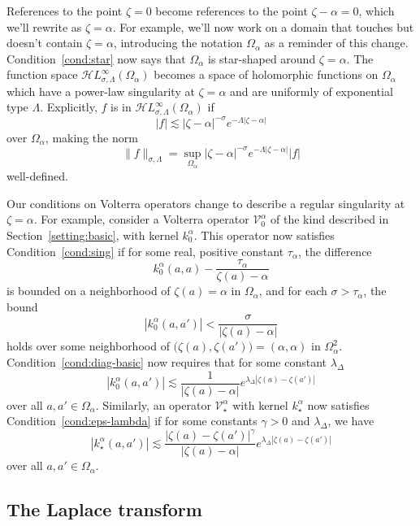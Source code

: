 \documentclass{article}
\theoremstyle{plain}
\newcommand{\singexp}[2]{\mathcal{H}L^\infty_{#1, #2}}
\newcommand{\hardpart}{\mathcal{V}_0}
\newcommand{\softpart}{\mathcal{V}_\star}
\newcommand{\hardker}{k_0}
\newcommand{\softker}{k_\star}
\newcommand{\domain}{\Omega}
\begin{document}
References to the point $\zeta=0$ become references to the point $\zeta-\alpha=0$, which we'll rewrite as $\zeta=\alpha$. For example, we'll now work on a domain that touches but doesn't contain $\zeta = \alpha$, introducing the notation $\domain_\alpha$ as a reminder of this change. Condition~\eqref{cond:star} now says that $\domain_\alpha$ is star-shaped around $\zeta = \alpha$. The function space $\singexp{\sigma}{\Lambda}(\domain_\alpha)$ becomes a space of holomorphic functions on $\domain_\alpha$ which have a power-law singularity at $\zeta=\alpha$ and are uniformly of exponential type $\Lambda$. Explicitly, $f$ is in $\singexp{\sigma}{\Lambda}(\domain_\alpha)$ if 
\[ |f| \lesssim |\zeta-\alpha|^{-\sigma} e^{-\Lambda |\zeta-\alpha|} \]
over $\domain_\alpha$, making the norm
\[ \|f\|_{\sigma, \Lambda} = \sup_{\domain_\alpha} |\zeta-\alpha|^{-\sigma} e^{-\Lambda |\zeta-\alpha|} |f| \]
well-defined.

Our conditions on Volterra operators change to describe a regular singularity at $\zeta = \alpha$. For example, consider a Volterra operator $\hardpart^\alpha$ of the kind described in Section~\ref{setting:basic}, with kernel $\hardker^\alpha$. This operator now satisfies Condition~\eqref{cond:sing} if for some real, positive constant $\tau_\alpha$, the difference
\[ \hardker^\alpha(a, a) - \frac{\tau_\alpha}{\zeta(a) - \alpha} \]
is bounded on a neighborhood of $\zeta(a) = \alpha$ in $\domain_\alpha$, and for each $\sigma > \tau_\alpha$, the bound
\[ |\hardker^\alpha(a, a')| < \frac{\sigma}{|\zeta(a) - \alpha|} \]
holds over some neighborhood of $\big(\zeta(a), \zeta(a')\big) = (\alpha,\alpha)$ in $\domain_\alpha^2$. Condition~\eqref{cond:diag-basic} now requires that for some constant $\lambda_\Delta$
\[|\hardker^\alpha(a,a')|\lesssim\frac{1}{|\zeta(a)-\alpha|} e^{\lambda_\Delta|\zeta(a)-\zeta(a')|}\]
over all $a,a'\in\domain_\alpha$. 
Similarly, an operator $\softpart^\alpha$ with kernel $\softker^\alpha$ now satisfies Condition~\eqref{cond:eps-lambda} if for some constants $\gamma > 0$ and $\lambda_\Delta$, we have
\[ |\softker^\alpha(a,a')| \lesssim \frac{|\zeta(a)-\zeta(a')|^\gamma}{|\zeta(a)-\alpha|} e^{\lambda_\Delta |\zeta(a)-\zeta(a')|}\]
over all $a, a' \in \domain_\alpha$.
\subsection{The Laplace transform}
\end{document}
